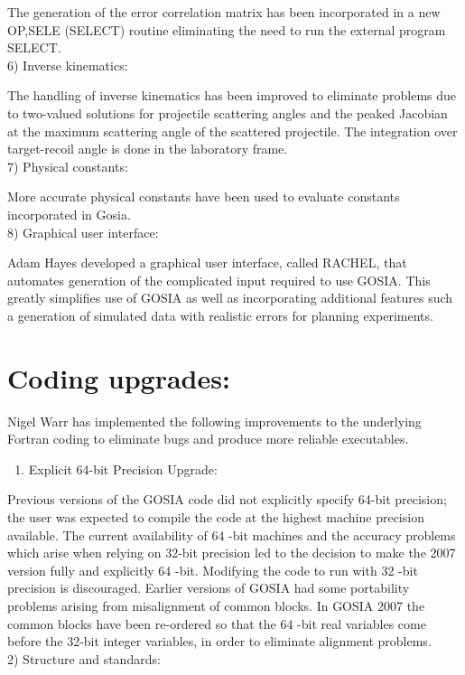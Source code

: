 \documentclass[10pt]{article}
\begin{document}
The generation of the error correlation matrix has been incorporated in a new OP,SELE (SELECT) routine eliminating the need to run the external program SELECT.\\
6) Inverse kinematics:

The handling of inverse kinematics has been improved to eliminate problems due to two-valued solutions for projectile scattering angles and the peaked Jacobian at the maximum scattering angle of the scattered projectile. The integration over target-recoil angle is done in the laboratory frame.\\
7) Physical constants:

More accurate physical constants have been used to evaluate constants incorporated in Gosia.\\
8) Graphical user interface:

Adam Hayes developed a graphical user interface, called RACHEL, that automates generation of the complicated input required to use GOSIA. This greatly simplifies use of GOSIA as well as incorporating additional features such a generation of simulated data with realistic errors for planning experiments.

\section*{Coding upgrades:}
Nigel Warr has implemented the following improvements to the underlying Fortran coding to eliminate bugs and produce more reliable executables.

\begin{enumerate}
  \item Explicit 64-bit Precision Upgrade:
\end{enumerate}

Previous versions of the GOSIA code did not explicitly specify 64-bit precision; the user was expected to compile the code at the highest machine precision available. The current availability of 64 -bit machines and the accuracy problems which arise when relying on 32-bit precision led to the decision to make the 2007 version fully and explicitly 64 -bit. Modifying the code to run with 32 -bit precision is discouraged. Earlier versions of GOSIA had some portability problems arising from misalignment of common blocks. In GOSIA 2007 the common blocks have been re-ordered so that the 64 -bit real variables come before the 32-bit integer variables, in order to eliminate alignment problems.\\
2) Structure and standards:
\end{document}
